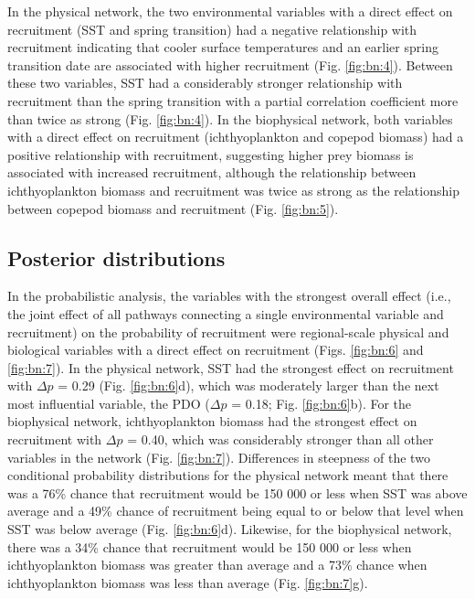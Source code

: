 In the physical network, the two environmental variables with a direct effect on
recruitment (SST and spring transition) had a negative relationship with
recruitment indicating that cooler surface temperatures and an earlier spring
transition date are associated with higher recruitment (Fig. \ref{fig:bn:4}). Between these
two variables, SST had a considerably stronger relationship with recruitment
than the spring transition with a partial correlation coefficient more than
twice as strong (Fig. \ref{fig:bn:4}). In the biophysical network, both variables with a
direct effect on recruitment (ichthyoplankton and copepod biomass) had a
positive relationship with recruitment, suggesting higher prey biomass is
associated with increased recruitment, although the relationship between
ichthyoplankton biomass and recruitment was twice as strong as the relationship
between copepod biomass and recruitment (Fig. \ref{fig:bn:5}).


\subsection{Posterior distributions}

In the probabilistic analysis, the variables with the strongest overall effect
(i.e., the joint effect of all pathways connecting a single environmental
variable and recruitment) on the probability of recruitment were regional-scale
physical and biological variables with a direct effect on recruitment (Figs. 
\ref{fig:bn:6} and \ref{fig:bn:7}). In the physical network, SST had the strongest effect on recruitment with
\(\Delta p\) = 0.29 (Fig.  \ref{fig:bn:6}d), which was moderately larger than the next most
influential variable, the PDO (\(\Delta p\) = 0.18; Fig. \ref{fig:bn:6}b). For the
biophysical network, ichthyoplankton biomass had the strongest effect on
recruitment with \(\Delta p\) = 0.40, which was considerably stronger than all
other variables in the network (Fig. \ref{fig:bn:7}). Differences in steepness of the two
conditional probability distributions for the physical network meant that there
was a 76\% chance that recruitment would be 150 000 or less when SST was above
average and a 49\% chance of recruitment being equal to or below that level when
SST was below average (Fig. \ref{fig:bn:6}d). Likewise, for the biophysical network, there
was a 34\% chance that recruitment would be 150 000 or less when ichthyoplankton
biomass was greater than average and a 73\% chance when ichthyoplankton biomass
was less than average (Fig. \ref{fig:bn:7}g).

